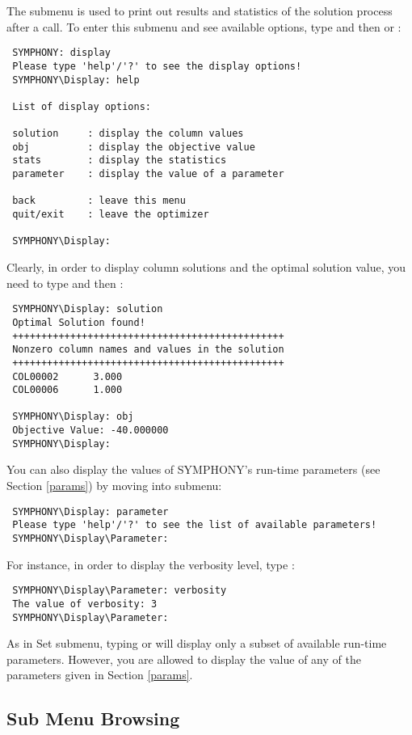 The  submenu is used to print out results and statistics of the
solution process after a  call. To enter this submenu and see
available options, type  and then  or :
{\color{Brown}
\begin{verbatim}
 SYMPHONY: display
 Please type 'help'/'?' to see the display options!
 SYMPHONY\Display: help

 List of display options:

 solution     : display the column values
 obj          : display the objective value
 stats        : display the statistics
 parameter    : display the value of a parameter

 back         : leave this menu
 quit/exit    : leave the optimizer

 SYMPHONY\Display:
\end{verbatim}
}
Clearly, in order to display column solutions and the optimal solution value, 
you need to type  and then :
{\color{Brown}
\begin{verbatim}
 SYMPHONY\Display: solution
 Optimal Solution found!
 +++++++++++++++++++++++++++++++++++++++++++++++
 Nonzero column names and values in the solution
 +++++++++++++++++++++++++++++++++++++++++++++++
 COL00002      3.000
 COL00006      1.000

 SYMPHONY\Display: obj
 Objective Value: -40.000000
 SYMPHONY\Display:
\end{verbatim}
}
You can also display the values of SYMPHONY's run-time parameters (see Section
\ref{params}) by moving into  submenu: 
{\color{Brown}
\begin{verbatim}
 SYMPHONY\Display: parameter
 Please type 'help'/'?' to see the list of available parameters!
 SYMPHONY\Display\Parameter:
\end{verbatim}
}
For instance, in order to display the verbosity level, type :
{\color{Brown}
\begin{verbatim}
 SYMPHONY\Display\Parameter: verbosity 
 The value of verbosity: 3
 SYMPHONY\Display\Parameter:
\end{verbatim}
}
As in Set submenu, typing  or  will display only a subset of 
available run-time parameters. However, you are allowed to display the value of
any of the parameters given in Section \ref{params}. 

\subsection{Sub Menu Browsing}

